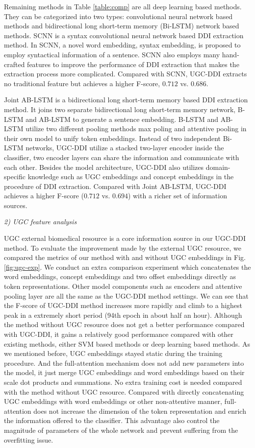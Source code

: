\documentclass[conference]{IEEEtran}
\begin{document}
Remaining methods in Table \ref{table:comp} are all deep learning based methods.
They can be categorized into two types: convolutional neural network based methods and bidirectional long short-term memory (Bi-LSTM) network based methods.
SCNN \cite{zhao_drug_2016} is a syntax convolutional neural network based DDI extraction method.
In SCNN, a novel word embedding, syntax embedding, is proposed to employ syntactical information of a sentence.
SCNN also employs many hand-crafted features to improve the performance of DDI extraction that makes the extraction process more complicated.
Compared with SCNN, UGC-DDI extracts no traditional feature but achieves a higher F-score, $0.712$ vs. $0.686$.

Joint AB-LSTM is a bidirectional long short-term memory based DDI extraction method.
It joins two separate bidirectional long short-term memory network, B-LSTM and AB-LSTM to generate a sentence embedding.
B-LSTM and AB-LSTM utilize two different pooling methods max poling and attentive pooling in their own model to unify token embeddings.
Instead of two independent Bi-LSTM networks, UGC-DDI utilize a stacked two-layer encoder inside the classifier,
two encoder layers can share the information and communicate with each other.
Besides the model architecture, UGC-DDI also utilizes domain-specific knowledge such as UGC embeddings and concept embeddings
in the procedure of DDI extraction.
Compared with Joint AB-LSTM, UGC-DDI achieves a higher F-score ($0.712$ vs. $0.694$) with a richer set of information sources.

\bigbreak
\emph{2) UGC feature analysis}
\bigbreak

UGC external biomedical resource is a core information source in our UGC-DDI method.
To evaluate the improvement made by the external UGC resource, we compared the metrics of our method
with and without UGC embeddings in Fig. \ref{fig:ugc-exp}.
We conduct an extra comparison experiment which concatenates the word embeddings, concept embeddings and two offset embeddings directly as token representations.
Other model components such as encoders and attentive pooling layer are all the same as the UGC-DDI method settings.
We can see that the F-score of UGC-DDI method increases more rapidly and climb to a highest peak in a extremely short period (94th epoch in about half an hour).
Although the method without UGC resource does not get a better performance compared with UGC-DDI,
it gains a relatively good performance compared with other existing methods, either SVM based methods or deep learning based methods.
As we mentioned before, UGC embeddings stayed static during the training procedure.
And the full-attention mechanism does not add new parameters into the model, it just merge UGC embeddings and word embeddings based on their
scale dot products and summations.
No extra training cost is needed compared with the method without UGC resource.
Compared with directly concatenating UGC embeddings with word embeddings or other non-attentive manner,
full-attention does not increase the dimension of the token representation and enrich the information offered to the classifier.
This advantage also control the magnitude of parameters of the whole network and prevent suffering from the overfitting issue.
\end{document}
